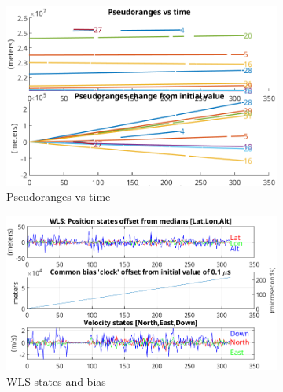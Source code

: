         \begin{figure}[h!]
            \centering
            \begin{subfigure}{0.23\textwidth}
                \includegraphics[width=\textwidth]{images/tests/Monte_Cappuccini/Spoofing/task5_figures/Samsung_A51_Monte_Cappuccini_fig1.png}
                \caption{Pseudoranges vs time}
                \label{fig:Spoofed_a}
            \end{subfigure}
            \hfill
            \begin{subfigure}{0.23\textwidth}
                \includegraphics[width=\textwidth]{images/tests/Monte_Cappuccini/Spoofing/task5_figures/Samsung_A51_Monte_Cappuccini_fig5.png}
                \caption{WLS states and bias}
                \label{fig:Spoofed_b}
            \end{subfigure}
            \hfill
            \begin{subfigure}{0.22\textwidth}            
                \vspace{0.40cm}

\end{subfigure}
\end{figure}
